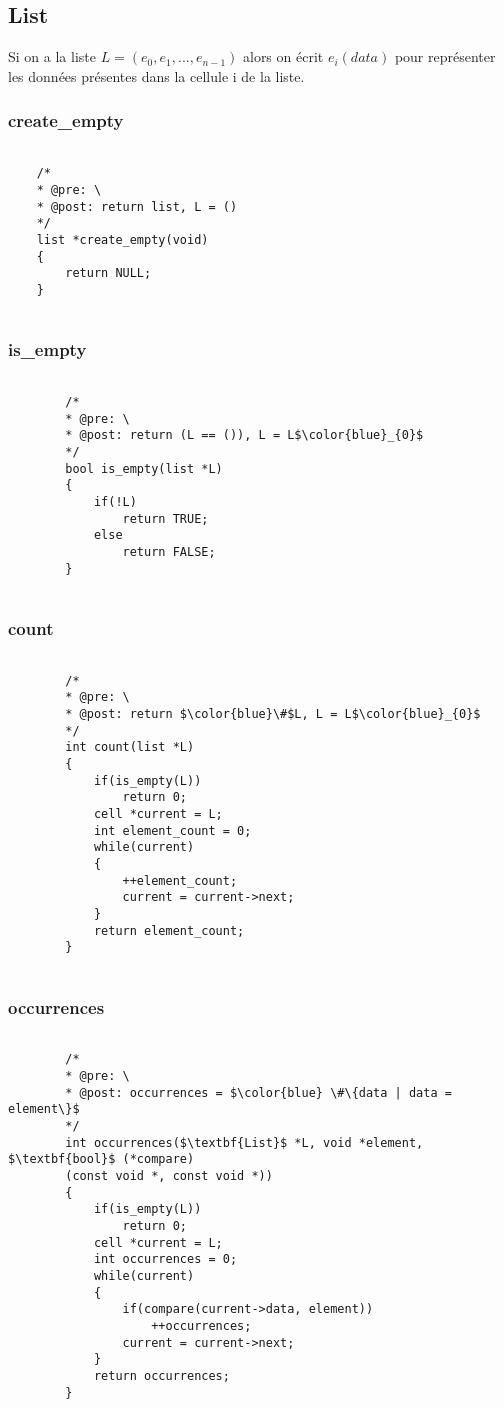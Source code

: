 \documentclass[a4paper, 11pt, oneside]{article}
\begin{document}
	\clearpage
	\subsection{List}
	
	Si on a la liste $L = (e_0, e_1,..., e_{n-1})$ alors on écrit $e_i(data)$ pour représenter les données présentes dans la cellule i de la liste.
	
	\subsubsection{create\_empty}
	
	\begin{lstlisting}[mathescape]
	
	/*
	* @pre: \
	* @post: return list, L = ()
	*/
	list *create_empty(void)
	{
		return NULL;
	}
	
	\end{lstlisting}	
	
	\subsubsection{is\_empty}
	
	\begin{lstlisting}[mathescape]
	
		/*
		* @pre: \
		* @post: return (L == ()), L = L$\color{blue}_{0}$
		*/
		bool is_empty(list *L)
		{
			if(!L)
				return TRUE;
			else
				return FALSE;
		}
	
	\end{lstlisting}
	
	\clearpage
	\subsubsection{count}
	
	\begin{lstlisting}[mathescape]
	
		/*
		* @pre: \
		* @post: return $\color{blue}\#$L, L = L$\color{blue}_{0}$
		*/	
		int count(list *L)
		{
			if(is_empty(L))
				return 0;
			cell *current = L;
			int element_count = 0;
			while(current)
			{
				++element_count;
				current = current->next;
			}
			return element_count;
		}
		
	\end{lstlisting}
	
	\subsubsection{occurrences}
	\begin{lstlisting}[mathescape]
	
		/*
		* @pre: \
		* @post: occurrences = $\color{blue} \#\{data | data = element\}$
		*/
		int occurrences($\textbf{List}$ *L, void *element, $\textbf{bool}$ (*compare)
		(const void *, const void *))
		{
			if(is_empty(L))
				return 0;
			cell *current = L;
			int occurrences = 0;
			while(current)
			{
				if(compare(current->data, element))
					++occurrences;
				current = current->next;
			}
			return occurrences;
		}
	
	\end{lstlisting}
	
\end{document}
